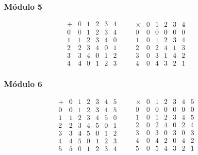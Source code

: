 \documentclass[handout]{beamer}
\begin{document}

\begin{frame}
  \frametitle{Módulo 5}

    \[
    \begin{array}{c|ccccc}
      + & 0 & 1 & 2 & 3 & 4 \\
      \hline
      0 & 0 & 1 & 2 & 3 & 4 \\
      1 & 1 & 2 & 3 & 4 & 0 \\
      2 & 2 & 3 & 4 & 0 & 1 \\
      3 & 3 & 4 & 0 & 1 & 2 \\
      4 & 4 & 0 & 1 & 2 & 3
    \end{array}
    \quad\quad
    \begin{array}{c|ccccc}
      \times & 0 & 1 & 2 & 3 & 4 \\
      \hline
      0 & 0 & 0 & 0 & 0 & 0 \\
      1 & 0 & 1 & 2 & 3 & 4 \\
      2 & 0 & 2 & 4 & 1 & 3 \\
      3 & 0 & 3 & 1 & 4 & 2 \\
      4 & 0 & 4 & 3 & 2 & 1
    \end{array}
  \]
\end{frame}


\begin{frame}
  \frametitle{Módulo 6}

  \[
    \begin{array}{c|cccccc}
      + & 0 & 1 & 2 & 3 & 4 & 5 \\
      \hline
      0 & 0 & 1 & 2 & 3 & 4 & 5 \\
      1 & 1 & 2 & 3 & 4 & 5 & 0 \\
      2 & 2 & 3 & 4 & 5 & 0 & 1 \\
      3 & 3 & 4 & 5 & 0 & 1 & 2 \\
      4 & 4 & 5 & 0 & 1 & 2 & 3 \\
      5 & 5 & 0 & 1 & 2 & 3 & 4
    \end{array}
    \quad\quad
    \begin{array}{c|cccccc}
      \times & 0 & 1 & 2 & 3 & 4 & 5 \\
      \hline
      0 & 0 & 0 & 0 & 0 & 0 & 0 \\
      1 & 0 & 1 & 2 & 3 & 4 & 5 \\
      2 & 0 & 2 & 4 & 0 & 2 & 4 \\
      3 & 0 & 3 & 0 & 3 & 0 & 3 \\
      4 & 0 & 4 & 2 & 0 & 4 & 2 \\
      5 & 0 & 5 & 4 & 3 & 2 & 1
    \end{array}
  \]
\end{frame}
\end{document}
